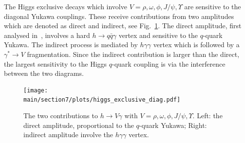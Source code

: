 \documentclass[../report.tex]{subfiles}
\providecommand{\main}{..}
\begin{document}
The Higgs exclusive decays which involve $V=\rho,\omega,\phi,J/\psi,\Upsilon$ are sensitive to the diagonal Yukawa couplings. 
These receive contributions from two amplitudes which are denoted as direct and indirect, see Fig.~\ref{fig:hexlusive}. 
The direct amplitude, first analysed in~\cite{Keung:1983ac}, involves a hard $h\to q\bar{q}\gamma$ vertex and sensitive to the $q$-quark Yukawa. 
The indirect process is mediated by $h\gamma\gamma$ vertex which is followed by a $\gamma^*\to V$ fragmentation. 
Since the indirect contribution is larger than the direct, the largest sensitivity to the Higgs $q$-quark coupling is via the interference between the two diagrams. 
\begin{figure}[t]
\begin{center}
\texttt{[image: \\main/section7/plots/higgs\_exclusive\_diag.pdf]}
\caption{The two contributions to $h \to V\gamma$ with $V=\rho,\omega,\phi,J/\psi,\Upsilon$. Left: the direct amplitude, proportional to  the $q$-quark Yukawa; Right: indirect amplitude involve the $h\gamma\gamma$ vertex.}
\label{fig:hexlusive}
\end{center}
\end{figure}
\end{document}
